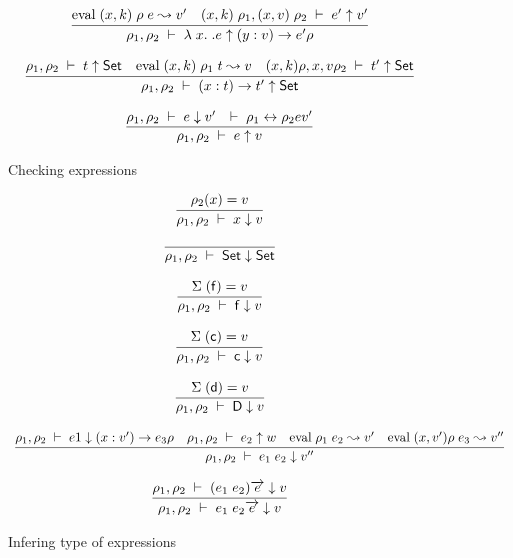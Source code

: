 \begin{figure}[p]
\[\begin{array}{c}
	  \infer{\Check{\rho_1}{\rho_2}{\lam x . e}{\EPi{y}{v}{e'}{\rho}}}
          { \Eval{(x,k)\;\rho}{e}{v'} & \Check{(x,k)\;\rho_1}{(x,v)\;\rho_2}{e'}{v'}} 
\end{array}
\]

\[\begin{array}{c}
	  \infer{\Check{\rho_1}{\rho_2}{\EPi{x}{t}{t'}}{\Set}}
          {\IsType{\rho_1}{\rho_2}{t}  
	    & \Eval{(x,k)\;\rho_1}{t}{v}
	    & \IsType{(x,k)\rho}{{x,v}\rho_2}{t'}}
\end{array}
\]

\[\begin{array}{c}
	  \infer{\Check{\rho_1}{\rho_2}{e}{v}} 
          { \Infer{\rho_1}{\rho_2}{e}{v'} & \EqVal{\rho_1}{\rho_2}{e}{v'}} 
\end{array}
\]
\caption{Checking expressions}
\end{figure}

\begin{figure}[p]
\[\begin{array}{c}
	  \infer{\Infer{\rho_1}{\rho_2}{x}{v}} 
          {\Lookup{\rho_2}{x}{v}}
\end{array}
\]

\[\begin{array}{c}
	  \infer{\Infer{\rho_1}{\rho_2}{\Set}{\Set}} 
          {}
\end{array}
\]

\[\begin{array}{c}
	  \infer{\Infer{\rho_1}{\rho_2}{\ff}{v}} 
          {\Lookup{\Sig}{\ff}{v}}
\end{array}
\]

\[\begin{array}{c}
	  \infer{\Infer{\rho_1}{\rho_2}{\cc}{v}} 
          {\Lookup{\Sig}{\cc}{v}}
\end{array}
\]

\[\begin{array}{c}
	  \infer{\Infer{\rho_1}{\rho_2}{\DD}{v}} 
          {\Lookup{\Sig}{\dd}{v}}
\end{array}
\]

\[\begin{array}{c}
	  \infer{\Infer{\rho_1}{\rho_2}{e_1 \; e_2}{v''}}
{\Infer{\rho_1}{\rho_2}{e1}{\EPi{x}{v'}{e_3}{\rho}}
& \Check{\rho_1}{\rho_2}{e_2}{w}
& \Eval{\rho_1}{e_2}{v'}
& \Eval{(x,v')\rho}{e_3}{v''}}

\end{array}
\]

\[\begin{array}{c}
	  \infer{\Infer{\rho_1}{\rho_2}{e_1 \; e_2 \vec{e}}{v}
	  } 
          {\Infer{\rho_1}{\rho_2}{(e_1 \; e_2) \vec{e}}{v}}
\end{array}
\]



\caption{Infering type of expressions}
\end{figure}

